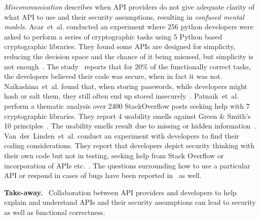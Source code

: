 \documentclass[conference]{IEEEtran}
\newenvironment{finding}{\begin{framed}\noindent\textbf{Take-away.}~}{\end{framed}}
\newcommand{\etal}[0]{et~al{.}}
\begin{document}
\emph{Miscommunication} describes when API providers do not give adequate clarity of what API to use and their security assumptions, resulting in \emph{confused mental models}. Acar~\etal{} conducted an experiment where 256 python developers were asked to perform a series of cryptographic tasks using 5 Python based cryptographic libraries. They found some APIs are designed for simplicity, reducing the decision space and the chance of it being misused, but simplicity is not enough~\cite{acarusability2017,justin2015,fahl2012,robillard2011}. The study~\cite{acarusability2017} reports that for 20\% of the functionally correct tasks, the developers believed their code was secure, when in fact it was not. Naikashina~\etal{} found that, when storing passwords, while developers  might hash or salt them, they still often end up stored insecurely~\cite{naiakshina2017,naiakshina2018,naiakshina2019}. Patnaik~\etal{} perform a thematic analysis over 2400 StackOverflow posts seeking help with 7 cryptographic libraries. They report 4 usability smells against Green \& Smith's 10 principles~\cite{smithgreen2016}. The usability smells result due to missing or hidden information~\cite{patnaik2019}. Van~der~Linden~\etal{} conduct an experiment with developers to find their coding considerations. They report that developers depict security thinking with their own code but not in testing, seeking help from Stack Overflow or incorporation of APIs etc.~\cite{linden2020}. The questions surrounding how to use a particular API or respond in cases of bugs have been reported in~\cite{patnaik2019,acarusability2017,mindermanrust2018} as well. 
\begin{finding}
  \noindent
 Collaboration between API providers and developers to help explain  and understand  APIs and their security assumptions can lead to security as well as functional correctness.   
\end{finding}
\end{document}
